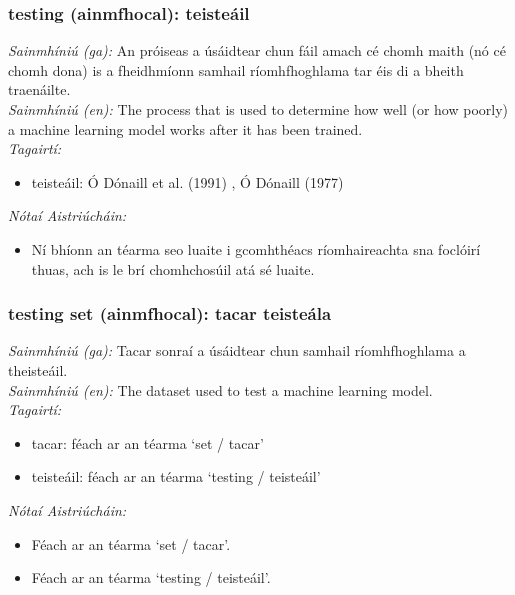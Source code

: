 \subsubsection*{testing (ainmfhocal): teisteáil}
 \noindent \textit{Sainmhíniú (ga):} An próiseas a úsáidtear chun fáil amach cé chomh maith (nó cé chomh dona) is a fheidhmíonn samhail ríomhfhoghlama tar éis di a bheith traenáilte.
\\
 \noindent \textit{Sainmhíniú (en):} The process that is used to determine how well (or how poorly) a machine learning model works after it has been trained.
\\
 \noindent \textit{Tagairtí:}
\begin{itemize}
	\item teisteáil: Ó Dónaill et al. (1991) \cite{focloir-beag}, Ó Dónaill (1977) \cite{odonaill}
\end{itemize}

 \noindent \textit{Nótaí Aistriúcháin:}
\begin{itemize}
	\item Ní bhíonn an téarma seo luaite i gcomhthéacs ríomhaireachta sna foclóirí thuas, ach is le brí chomhchosúil atá sé luaite.
\end{itemize}


\subsubsection*{testing set (ainmfhocal): tacar teisteála}
 \noindent \textit{Sainmhíniú (ga):} Tacar sonraí a úsáidtear chun samhail ríomhfhoghlama a theisteáil.
\\
 \noindent \textit{Sainmhíniú (en):} The dataset used to test a machine learning model.
\\
 \noindent \textit{Tagairtí:}
\begin{itemize}
	\item tacar: féach ar an téarma `set / tacar'
	\item teisteáil: féach ar an téarma `testing / teisteáil'
\end{itemize}

 \noindent \textit{Nótaí Aistriúcháin:}
\begin{itemize}
	\item Féach ar an téarma `set / tacar'.
	\item Féach ar an téarma `testing / teisteáil'.
\end{itemize}


